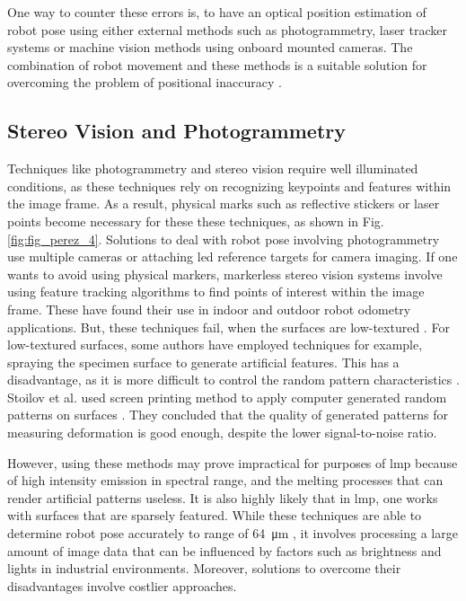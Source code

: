     \noindent One way to counter these errors is, to have an optical position estimation of robot pose using either external methods such as photogrammetry, laser tracker systems or machine vision methods using onboard mounted cameras. The combination of robot movement and these methods is a suitable solution for overcoming the problem of positional inaccuracy \cite{perez}.
    
    \subsection*{Stereo Vision and Photogrammetry}
        Techniques like photogrammetry and stereo vision require well illuminated conditions, as these techniques rely on recognizing keypoints and features within the image frame. As a result, physical marks such as reflective stickers or laser points become necessary for these these techniques, as shown in Fig. \ref{fig:fig_perez_4}. Solutions to deal with robot pose involving photogrammetry use multiple cameras or attaching \gls{led} reference targets for camera imaging. If one wants to avoid using physical markers, markerless stereo vision systems involve using feature tracking algorithms to find points of interest within the image frame. These have found their use in indoor and outdoor robot odometry applications. But, these techniques fail, when the surfaces are low-textured \cite{perez}. For low-textured surfaces, some authors have employed techniques for example, spraying the specimen surface to generate artificial features. This has a disadvantage, as it is more difficult to control the random pattern characteristics \cite{stoilov}. Stoilov et al. used screen printing method to apply computer generated random patterns on surfaces \cite{stoilov}. They concluded that the quality of generated patterns for measuring deformation is good enough, despite the lower signal-to-noise ratio. 

        \vspace{5mm}
        \noindent However, using these methods may prove impractical for purposes of \gls{lmp} because of high intensity emission in spectral range, and the melting processes that can render artificial patterns useless. It is also highly likely that in \gls{lmp}, one works with surfaces that are sparsely featured. While these techniques are able to determine robot pose accurately to range of \SI{64}{\micro\meter} \cite{perez}, it involves processing a large amount of image data that can be influenced by factors such as brightness and lights in industrial environments. Moreover, solutions to overcome their disadvantages involve costlier approaches.
    
